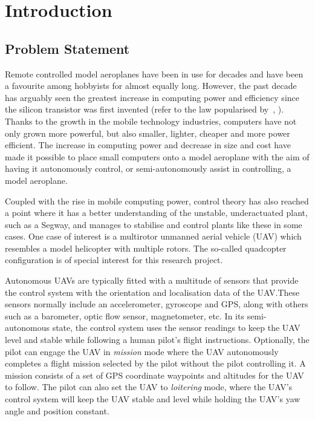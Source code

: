 \chapter{Introduction}
\label{chap1}

\section{Problem Statement}
\label{sec:problem-statement}

Remote controlled model aeroplanes have been in use for decades and have been a favourite among hobbyists for almost equally long. However, the past decade has arguably seen the greatest increase in computing power and efficiency since the silicon transistor was first invented (refer to the law popularised by~\citeauthor{moore2005cramming}, \citeyear{moore2005cramming}). Thanks to the growth in the mobile technology industries, computers have not only grown more powerful, but also smaller, lighter, cheaper and more power efficient. The increase in computing power and decrease in size and cost have made it possible to place small computers onto a model aeroplane with the aim of having it autonomously control, or semi-autonomously assist in controlling, a model aeroplane. 

Coupled with the rise in mobile computing power, control theory has also reached a point where it has a better understanding of the unstable, underactuated plant, such as a Segway, and manages to stabilise and control plants like these in some cases. One case of interest is a multirotor unmanned aerial vehicle (UAV) which resembles a model helicopter with multiple rotors. The so-called quadcopter configuration is of special interest for this research project.  

Autonomous UAVs are typically fitted with a multitude of sensors that provide the control system with the orientation and localisation data of the UAV.\@ These sensors normally include an accelerometer, gyroscope and GPS, along with others such as a barometer, optic flow sensor, magnetometer, etc. In its semi-autonomous state, the control system uses the sensor readings to keep the UAV level and stable while following a human pilot's flight instructions. Optionally, the pilot can engage the UAV in \emph{mission} mode where the UAV autonomously completes a flight mission selected by the pilot without the pilot controlling it. A mission consists of a set of GPS coordinate waypoints and altitudes for the UAV to follow. The pilot can also set the UAV to \emph{loitering} mode, where the UAV's control system will keep the UAV stable and level while holding the UAV's yaw angle and position constant. 

